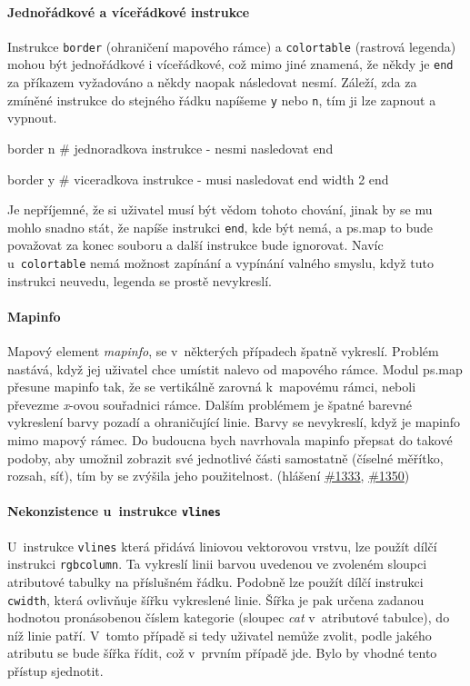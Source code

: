 \documentclass[a4paper,12pt,draft]{article}
\newcommand{\instr}[1]{\lstinline[style=psmapInline]|#1|}
\begin{document}
\paragraph*{Jednořádkové a víceřádkové instrukce}
\label{sec:psmap:singleline}
Instrukce \instr{border} (ohraničení mapo\-vého rámce) a \instr{colortable}
(rastrová legenda) mohou být jednořádkové i víceřádkové, což mimo
jiné znamená, že někdy je \instr{end} za příkazem vyžadováno a někdy
naopak následovat nesmí. Záleží, zda za zmíněné instrukce do stejného
řádku napíšeme \instr{y} nebo \instr{n}, tím ji lze zapnout a vypnout.
\begin{psmap}
border n    # jednoradkova instrukce - nesmi nasledovat end

border y    # viceradkova instrukce - musi nasledovat end
   width 2
end
\end{psmap}
Je nepříjemné, že si uživatel musí být vědom tohoto chování,
jinak by se mu mohlo snadno stát, že napíše instrukci \instr{end}, kde
být nemá, a ps.map to bude považovat za konec souboru a další
instrukce bude ignorovat.
Navíc u~\instr{colortable} nemá možnost zapínání a vypínání valného
smyslu, když tuto instrukci neuvedu, legenda se prostě nevykreslí.


\paragraph*{Mapinfo}
\label{sec:psmap:mapinfo}
Mapový element \emph{mapinfo}, se v~některých případech špatně
vykreslí. Problém nastává, když jej uživatel chce umístit nalevo
od mapového rámce. Modul ps.map přesune mapinfo tak, že se
vertikálně zarovná k~mapovému rámci, neboli převezme \emph{x}-ovou
souřadnici rámce. Dalším problémem je špatné barevné vykreslení barvy
pozadí a ohraničující linie. Barvy se nevykreslí, když je mapinfo
mimo mapový rámec.
Do budoucna bych navrhovala mapinfo přepsat do takové podoby, aby umožnil
zobrazit své jednotlivé části samostatně (číselné měřítko, rozsah, síť), tím
by se zvýšila jeho použitelnost.
(hlášení \href{https://trac.osgeo.org/grass/ticket/1333}{\#1333},
\href{https://trac.osgeo.org/grass/ticket/1350}{\#1350})


\paragraph*{Nekonzistence u~instrukce \instr{vlines}}
\label{sec:psmap:vlines}
U~instrukce \instr{vlines} která přidává liniovou vektorovou vrstvu,
lze použít dílčí instrukci \instr{rgbcolumn}. Ta vykreslí   linii
barvou uvedenou ve zvoleném sloupci atributové tabulky na příslušném
řádku. Podobně lze použít dílčí instrukci \instr{cwidth}, která
ovlivňuje šířku vykreslené linie. Šířka je pak určena zadanou hodnotou
pronásobenou číslem kategorie (sloupec \emph{cat} v~atributové tabulce),
do níž linie patří. V~tomto případě si tedy uživatel nemůže zvolit,
podle jakého atributu se bude šířka řídit, což v~prvním případě
jde. Bylo by vhodné tento přístup sjednotit.
\end{document}
